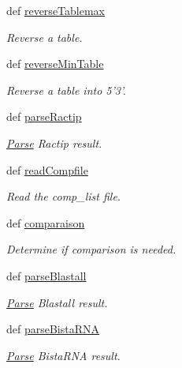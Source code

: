 \begin{DoxyCompactItemize}
def \hyperlink{classirna_1_1iRNA__pred_1_1Parse_1_1Parse_a7415a4bdf5f5b461c0459ac977ec0377}{reverse\-Tablemax}
\begin{DoxyCompactList}\small\item\em \-Reverse a table. \end{DoxyCompactList}\item 
def \hyperlink{classirna_1_1iRNA__pred_1_1Parse_1_1Parse_a81b14fb219d000fee4ec906fa3056cb0}{reverse\-Min\-Table}
\begin{DoxyCompactList}\small\item\em \-Reverse a table into 5'3'. \end{DoxyCompactList}\item 
def \hyperlink{classirna_1_1iRNA__pred_1_1Parse_1_1Parse_ab90f1e84f0d701d74d5a7d503d8ceb73}{parse\-Ractip}
\begin{DoxyCompactList}\small\item\em \hyperlink{classirna_1_1iRNA__pred_1_1Parse_1_1Parse}{\-Parse} \-Ractip result. \end{DoxyCompactList}\item 
def \hyperlink{classirna_1_1iRNA__pred_1_1Parse_1_1Parse_a86f632f2dbf49e1c6ff821751027a15c}{read\-Compfile}
\begin{DoxyCompactList}\small\item\em \-Read the comp\-\_\-list file. \end{DoxyCompactList}\item 
def \hyperlink{classirna_1_1iRNA__pred_1_1Parse_1_1Parse_acbe627045324c3f65e4994006a88e0bd}{comparaison}
\begin{DoxyCompactList}\small\item\em \-Determine if comparison is needed. \end{DoxyCompactList}\item 
def \hyperlink{classirna_1_1iRNA__pred_1_1Parse_1_1Parse_adc88307ddf59335469f3dbd81d8c5827}{parse\-Blastall}
\begin{DoxyCompactList}\small\item\em \hyperlink{classirna_1_1iRNA__pred_1_1Parse_1_1Parse}{\-Parse} \-Blastall result. \end{DoxyCompactList}\item 
def \hyperlink{classirna_1_1iRNA__pred_1_1Parse_1_1Parse_a573cec33f976ad9f09bc2d0056900571}{parse\-Bista\-R\-N\-A}
\begin{DoxyCompactList}\small\item\em \hyperlink{classirna_1_1iRNA__pred_1_1Parse_1_1Parse}{\-Parse} \-Bista\-R\-N\-A result. \end{DoxyCompactList}\item 

\end{DoxyCompactItemize}
